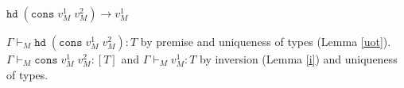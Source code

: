 \begin{case}
$\mathtt{hd}\;(\mathtt{cons}\;v_{M}^{1}\;v_{M}^{2})\rightarrow v_{M}^{1}$

$\Gamma\vdash_{M}\mathtt{hd}\;(\mathtt{cons}\;v_{M}^{1}\;v_{M}^{2}):T$ by premise and uniqueness of types (Lemma \ref{uot}).  $\Gamma\vdash_{M}\mathtt{cons}\;v_{M}^{1}\;v_{M}^{2}:[T]$ and $\Gamma\vdash_{M}v_{M}^{1}:T$ by inversion (Lemma \ref{i}) and uniqueness of types.
\end{case}